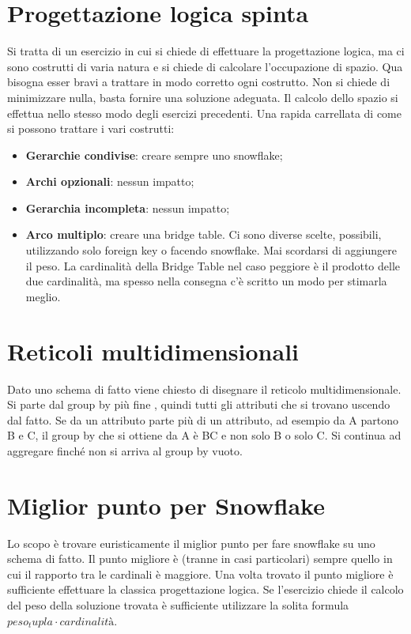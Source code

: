 \section{Progettazione logica spinta}
Si tratta di un esercizio in cui si chiede di effettuare la progettazione logica, ma ci sono costrutti di varia natura e si chiede di calcolare l'occupazione di spazio. Qua bisogna esser bravi a trattare in modo corretto ogni costrutto. Non si chiede di minimizzare nulla, basta fornire una soluzione adeguata. Il calcolo dello spazio si effettua nello stesso modo degli esercizi precedenti. Una rapida carrellata di come si possono trattare i vari costrutti:
\begin{itemize}
	\item \textbf{Gerarchie condivise}: creare sempre uno snowflake;
	\item \textbf{Archi opzionali}: nessun impatto;
	\item \textbf{Gerarchia incompleta}: nessun impatto;
	\item \textbf{Arco multiplo}: creare una bridge table. Ci sono diverse scelte, possibili, utilizzando solo foreign key o facendo snowflake. Mai scordarsi di aggiungere il peso. La cardinalità della Bridge Table nel caso peggiore è il prodotto delle due cardinalità, ma spesso nella consegna c'è scritto un modo per stimarla meglio.
\end{itemize}
\section{Reticoli multidimensionali}
Dato uno schema di fatto viene chiesto di disegnare il reticolo multidimensionale. Si parte dal group by più fine , quindi tutti gli attributi che si trovano uscendo dal fatto. Se da un attributo parte più di un attributo, ad esempio da A partono B e C, il group by che si ottiene da A è BC e non solo B o solo C. Si continua ad aggregare finché non si arriva al group by vuoto.
\section{Miglior punto per Snowflake}
Lo scopo è trovare euristicamente il miglior punto per fare snowflake su uno schema di fatto. Il punto migliore è (tranne in casi particolari) sempre quello in cui il rapporto tra le cardinali è maggiore. Una volta trovato il punto migliore è sufficiente effettuare la classica progettazione logica. Se l’esercizio chiede il calcolo del peso della soluzione trovata è sufficiente utilizzare la solita formula $peso_tupla \cdot cardinalità$.
